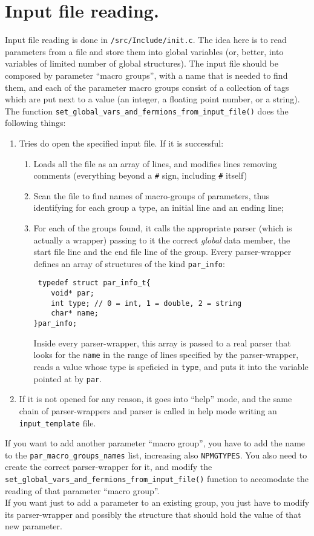 \documentclass[a4paper,10pt]{book}
\begin{document}
\section{Input file reading.}
Input file reading is done in \verb|/src/Include/init.c|. The idea here is to 
read parameters from a file and store them into global variables (or, better, 
into variables of limited number of global structures). The input file should 
be composed by parameter ``macro groups'', with a name that is needed to find 
them, and each of the parameter macro groups consist of a collection of tags 
which are put next to a value (an integer, a floating point number, or a 
string). The function 
\verb|set_global_vars_and_fermions_from_input_file()| does the 
following things:
\begin{enumerate}
 \item Tries do open the specified input file. If it is successful:
  \begin{enumerate}
   \item Loads all the file as an array of lines, and modifies lines removing 
comments (everything beyond a \verb|#| sign, including \verb|#| itself)
   \item Scan the file to find names of macro-groups of parameters, thus 
identifying for each group a type, an initial line and an ending line;
   \item For each of the groups found, it calls the appropriate parser (which 
is actually a wrapper) passing to it the correct \emph{global} data member, 
the start file line and the end file line of the group. Every parser-wrapper 
defines an array of structures of the kind \verb|par_info|:
\begin{verbatim}
 typedef struct par_info_t{
    void* par;
    int type; // 0 = int, 1 = double, 2 = string
    char* name;
}par_info;
\end{verbatim}
Inside every parser-wrapper, this array is passed to a real parser that looks 
for the \verb|name| in the range of lines specified by the parser-wrapper, 
reads a value whose type is speficied in \verb|type|, and puts it into the 
variable pointed at by \verb|par|.
  \end{enumerate}
\item If it is not opened for any reason, it goes into ``help'' mode, and the 
same chain of parser-wrappers and parser is called in help mode writing an 
\verb|input_template| file.
\end{enumerate}
If you want to add another parameter ``macro group'', you have to add the name 
to the \verb|par_macro_groups_names| list, increasing also \verb|NPMGTYPES|.
You also need to create the correct parser-wrapper for it, and modify the 
\verb|set_global_vars_and_fermions_from_input_file()| function to accomodate 
the reading of that parameter ``macro group''.\\
If you want just to add a parameter to an existing group, you just have to 
modify its parser-wrapper and possibly the structure that should hold the value 
of that new parameter.
\end{document}
